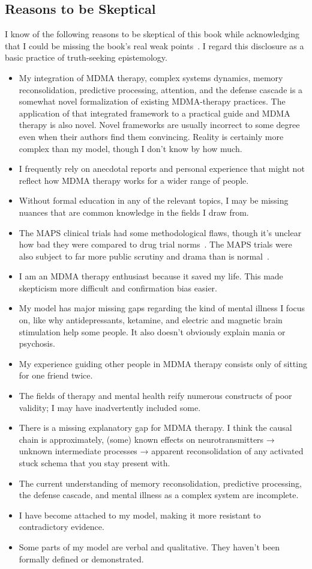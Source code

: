 \documentclass[11pt,oneside]{book}
\let\cite\parencite
\begin{document}
\subsection*{Reasons to be Skeptical}
I know of the following reasons to be skeptical of this book while acknowledging that I could be missing the book's real weak points~\cite{yudkowskiWeak}. I regard this disclosure as a basic practice of truth-seeking epistemology.
\begin{itemize}
    \item My integration of MDMA therapy, complex systems dynamics, memory reconsolidation, predictive processing, attention, and the defense cascade is a somewhat novel formalization of existing MDMA-therapy practices. The application of that integrated framework to a practical guide and MDMA therapy is also novel. Novel frameworks are usually incorrect to some degree even when their authors find them convincing. Reality is certainly more complex than my model, though I don't know by how much.
    \item I frequently rely on anecdotal reports and personal experience that might not reflect how MDMA therapy works for a wider range of people.
    \item Without formal education in any of the relevant topics, I may be missing nuances that are common knowledge in the fields I draw from.
    \item The MAPS clinical trials had some methodological flaws, though it's unclear how bad they were compared to drug trial norms~\cite{crl}. The MAPS trials were also subject to far more public scrutiny and drama than is normal~\cite{nytPsymposia}.
    \item I am an MDMA therapy enthusiast because it saved my life. This made skepticism more difficult and confirmation bias easier.
    \item My model has major missing gaps regarding the kind of mental illness I focus on, like why antidepressants, ketamine, and electric and magnetic brain stimulation help some people. It also doesn't obviously explain mania or psychosis.
    \item My experience guiding other people in MDMA therapy consists only of sitting for one friend twice.
    \item The fields of therapy and mental health reify numerous constructs of poor validity; I may have inadvertently included some.
    \item There is a missing explanatory gap for MDMA therapy. I think the causal chain is approximately, (some) known effects on neurotransmitters → unknown intermediate processes → apparent reconsolidation of any activated stuck schema that you stay present with.
    \item The current understanding of memory reconsolidation, predictive processing, the defense cascade, and mental illness as a complex system are incomplete.
    \item I have become attached to my model, making it more resistant to contradictory evidence.
    \item Some parts of my model are verbal and qualitative. They haven't been formally defined or demonstrated.
\end{itemize}
\end{document}
